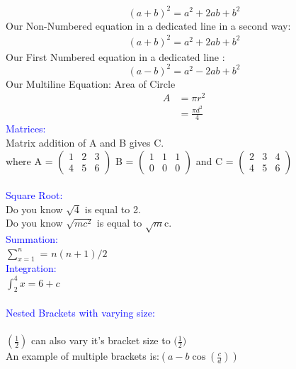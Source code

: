 \documentclass{article}
\begin{document}
\begin{equation}
	(a+b)^2 = a^2 + 2ab + b^2\nonumber
	\label{eq: a+b}
\end{equation}
Our Non-Numbered equation in a dedicated line in a second way: 
\begin{align}
	(a+b)^2 = a^2 + 2ab + b^2 \nonumber
\end{align}
Our First Numbered equation in a dedicated line :
\begin{equation}
	(a-b)^2 = a^2 - 2ab +b^2 
	\label{eq: a-b}
\end{equation}
Our Multiline Equation: Area of Circle
\begin{align}
	 A & = {\pi r^2 }\\ \nonumber
	   & = \frac{\pi d^2 }{4}
\end{align}
\textcolor{blue}{Matrices:}\\
Matrix addition of A and B gives C.\\
where
A = 
$\begin{pmatrix}
	1 & 2 & 3\\
	4 & 5 & 6
\end{pmatrix}$
B = $\begin{pmatrix}
	1 & 1 & 1\\
	0 & 0 & 0
\end{pmatrix}$
and C = $\begin{pmatrix}
	2 & 3 & 4\\
	4 & 5 & 6
\end{pmatrix}$\\
\\
\textcolor{blue}{Square Root:}\\
Do you know $\sqrt{4}$ is equal to 2.\\
Do you know $\sqrt{mc^2}$ is equal to $\sqrt{m}$c.
\\
\textcolor{blue}{Summation:}\\
$\sum_{x=1}^{n}$ = $n(n+1)/2$
\\
\textcolor{blue}{Integration:}\\
$\int_{2}^{4}x = 6 + c$\\
\\
\textcolor{blue}{Nested Brackets with varying size:}\\
\\
$(\frac{1}{2})$ can also vary it's bracket size to $\big(\frac{1}{2}\big)$\\
An example of multiple brackets is:$( a - b\cos (\frac {c}{d}) )$
\\
\\
\end{document}
